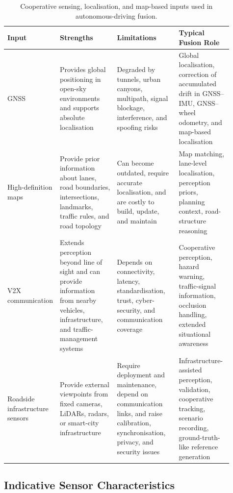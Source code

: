 \documentclass[graybox,envcountchap]{style/SNmono}
\begin{document}
\begin{table}[!t]
    \centering
    \renewcommand{\arraystretch}{1.25}
    \small
    \caption{Cooperative sensing, localisation, and map-based inputs used in autonomous-driving fusion.}
    \label{tab:av-cooperative-inputs}
    \begin{tabular}{p{0.13\linewidth} p{0.26\linewidth} p{0.28\linewidth} p{0.24\linewidth}}
        \hline
        \textbf{Input} & \textbf{Strengths} & \textbf{Limitations} & \textbf{Typical Fusion Role} \\
        \hline
        GNSS & Provides global positioning in open-sky environments and supports absolute localisation & Degraded by tunnels, urban canyons, multipath, signal blockage, interference, and spoofing risks & Global localisation, correction of accumulated drift in GNSS--IMU, GNSS--wheel odometry, and map-based localisation \\
        \hline
        High-definition maps & Provide prior information about lanes, road boundaries, intersections, landmarks, traffic rules, and road topology & Can become outdated, require accurate localisation, and are costly to build, update, and maintain & Map matching, lane-level localisation, perception priors, planning context, road-structure reasoning \\
        \hline
        V2X communication & Extends perception beyond line of sight and can provide information from nearby vehicles, infrastructure, and traffic-management systems & Depends on connectivity, latency, standardisation, trust, cyber-security, and communication coverage & Cooperative perception, hazard warning, traffic-signal information, occlusion handling, extended situational awareness \\
        \hline
        Roadside infrastructure sensors & Provide external viewpoints from fixed cameras, LiDARs, radars, or smart-city infrastructure & Require deployment and maintenance, depend on communication links, and raise calibration, synchronisation, privacy, and security issues & Infrastructure-assisted perception, validation, cooperative tracking, scenario recording, ground-truth-like reference generation \\
        \hline
    \end{tabular}
\end{table}

\subsection{Indicative Sensor Characteristics}
\label{subsec:sensor-characteristics}
\end{document}
